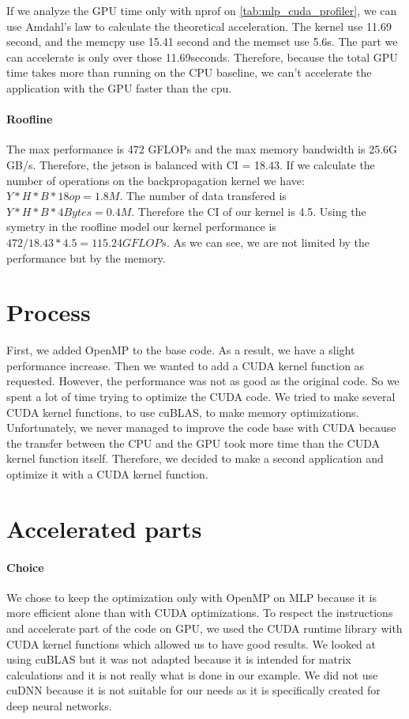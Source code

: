 \documentclass[11pt]{article}
\begin{document}
If we analyze the GPU time only with nprof on \ref{tab:mlp_cuda_profiler}, we can use Amdahl's law to calculate the theoretical acceleration.
The kernel use 11.69 second, and the memcpy use 15.41 second and the memset use 5.6s. The part we can accelerate is only over those 11.69seconds.
Therefore, because the total GPU time takes more than running on the CPU baseline, we can't accelerate the application with the GPU faster than the cpu.

\paragraph*{Roofline} 

The max performance is 472 GFLOPs and the max memory bandwidth is 25.6G GB/s. Therefore, the jetson is balanced with CI = 18.43.
If we calculate the number of operations on the backpropagation kernel we have: $Y * H * B * 18op = 1.8M$. The number of data transfered is $Y * H * B * 4Bytes = 0.4M$. 
Therefore the CI of our kernel is 4.5. Using the symetry in the roofline model our kernel performance is $ 472 / 18.43 * 4.5 = 115.24 GFLOPs$.
As we can see, we are not limited by the performance but by the memory.

\pagebreak
{}

\section{Process}
First, we added OpenMP to the base code. As a result, we have a slight performance increase.
Then we wanted to add a CUDA kernel function as requested.
However, the performance was not as good as the original code.
So we spent a lot of time trying to optimize the CUDA code.
We tried to make several CUDA kernel functions, to use cuBLAS, to make memory optimizations.
Unfortunately, we never managed to improve the code base with CUDA
because the transfer between the CPU and the GPU took more time than the CUDA kernel function itself.
Therefore, we decided to make a second application and optimize it with a CUDA kernel function.

\section{Accelerated parts}

\paragraph*{Choice}
We chose to keep the optimization only with OpenMP on MLP because it is more efficient alone than with CUDA optimizations.
To respect the instructions and accelerate part of the code on GPU, we used the CUDA runtime library with CUDA kernel functions which allowed us to have good results.
We looked at using cuBLAS but it was not adapted because it is intended for matrix calculations and it is not really what is done in our example.
We did not use cuDNN because it is not suitable for our needs as it is specifically created for deep neural networks.
\end{document}
